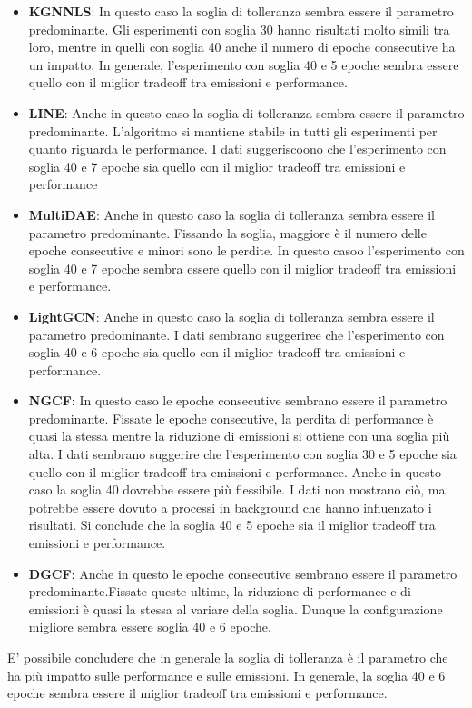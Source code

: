 \begin{itemize}
    \item \textbf{KGNNLS}: In questo caso la soglia di tolleranza sembra essere il parametro predominante. Gli esperimenti con soglia 30 hanno risultati molto simili tra loro, mentre in quelli con soglia 40 anche il numero di epoche consecutive ha un impatto. In generale, l'esperimento con soglia 40 e 5 epoche sembra essere quello con il miglior tradeoff tra emissioni e performance.
    \item \textbf{LINE}: Anche in questo caso la soglia di tolleranza sembra essere il parametro predominante. L'algoritmo si mantiene stabile in tutti gli esperimenti per quanto riguarda le performance. I dati suggeriscoono che l'esperimento con soglia 40 e 7 epoche sia quello con il miglior tradeoff tra emissioni e performance
    \item \textbf{MultiDAE}: Anche in questo caso la soglia di tolleranza sembra essere il parametro predominante. Fissando la soglia, maggiore è il numero delle epoche consecutive e minori sono le perdite. In questo casoo l'esperimento con soglia 40 e 7 epoche sembra essere quello con il miglior tradeoff tra emissioni e performance.
    \item \textbf{LightGCN}: Anche in questo caso la soglia di tolleranza sembra essere il parametro predominante. I dati sembrano suggeriree che l'esperimento con soglia 40 e 6 epoche sia quello con il miglior tradeoff tra emissioni e performance.
    \item \textbf{NGCF}: In questo caso le epoche consecutive sembrano essere il parametro predominante. Fissate le epoche consecutive, la perdita di performance è quasi la stessa mentre la riduzione di emissioni si ottiene con una soglia più alta. I dati sembrano suggerire che l'esperimento con soglia 30 e 5 epoche sia quello con il miglior tradeoff tra emissioni e performance. Anche in questo caso la soglia 40 dovrebbe essere più flessibile. I dati non mostrano ciò, ma potrebbe essere dovuto a processi in background che hanno influenzato i risultati. Si conclude che la soglia 40 e 5 epoche sia il miglior tradeoff tra emissioni e performance.
    \item \textbf{DGCF}: Anche in questo le epoche consecutive sembrano essere il parametro predominante.Fissate queste ultime, la riduzione di performance e di emissioni è quasi la stessa al variare della soglia. Dunque la configurazione migliore sembra essere soglia 40 e 6 epoche.
\end{itemize}

\noindent E' possibile concludere che in generale la soglia di tolleranza è il parametro che ha più impatto sulle performance e sulle emissioni. In generale, la soglia 40 e 6 epoche sembra essere il miglior tradeoff tra emissioni e performance.\\
